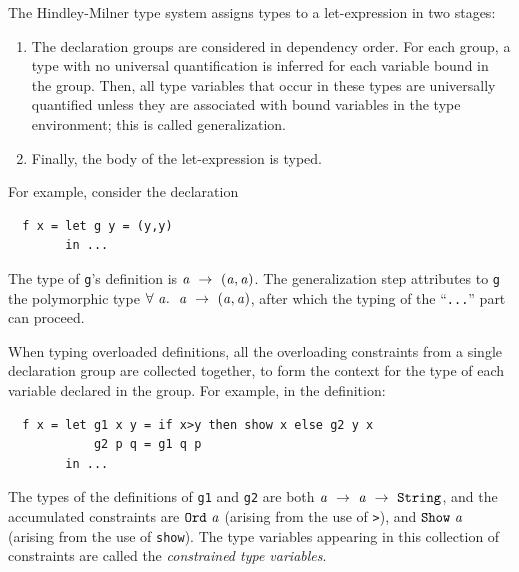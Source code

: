 \begin{haskellprime}

The Hindley-Milner type system assigns types to a let-expression in two stages:

\begin{enumerate}
\item The declaration groups are considered in dependency order. For
each group, a type with no universal quantification is inferred for
each variable bound in the group. Then, all type variables that occur
in these types are universally quantified unless they are associated
with bound variables in the type environment; this is called
generalization.

\item Finally, the body of the let-expression is typed.
\end{enumerate}

\end{haskellprime}

% 

For example, consider the declaration
\bprog
{\small\begin{verbatim}
  f x = let g y = (y,y)
        in ...

\end{verbatim}}
\eprog
The type of \mbox{\tt g}'s definition is 
\mbox{$\it a\ \rightarrow\ (a,a)$}.  The generalization step
attributes to \mbox{\tt g} the polymorphic type 
\mbox{$\it \forall\ a.~\ a\ \rightarrow\ (a,a)$},
after which the typing of the ``\mbox{\tt ...}'' part can proceed.

When typing overloaded definitions, all the overloading 
constraints from a single declaration group are collected together, 
to form the context for the type of each variable declared in the group.
For example, in the definition:
\bprog
{\small\begin{verbatim}
  f x = let g1 x y = if x>y then show x else g2 y x
            g2 p q = g1 q p
        in ...
\end{verbatim}}
\eprog
The types of the definitions of \mbox{\tt g1} and \mbox{\tt g2} are both
\mbox{$\it a\ \rightarrow\ a\ \rightarrow\ \makebox{\tt String}$}, and the accumulated constraints are
\mbox{$\it \makebox{\tt Ord}~a$} (arising from the use of \mbox{\tt >}), and \mbox{$\it \makebox{\tt Show}~a$} (arising from the
use of \mbox{\tt show}).
The type variables appearing in this collection of constraints are
called the {\em constrained type variables}.

